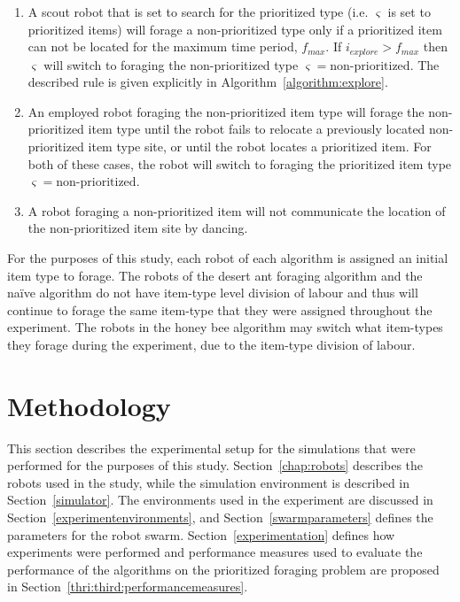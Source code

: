\documentclass[preprint,12pt]{elsarticle}
\begin{document}
\begin{enumerate}
\item A scout robot that is set to search for the prioritized type (i.e. $\varsigma$ is set to prioritized items) will forage a non-prioritized type only if a prioritized item can not be located for the maximum time period, $f_{max}$. If $i_{explore} > f_{max}$ then $\varsigma$ will switch to foraging the non-prioritized type $\varsigma=\text{non-prioritized}$. The described rule is given explicitly in Algorithm~\ref{algorithm:explore}.
\item An employed robot foraging the non-prioritized item type will forage the non-prioritized item type until the robot fails to relocate a previously located non-prioritized item type site, or until the robot locates a prioritized item. For both of these cases, the robot will switch to foraging the prioritized item type $\varsigma=\text{non-prioritized}$.
\item A robot foraging a non-prioritized item will not communicate the location of the non-prioritized item site by dancing. 
\end{enumerate}

For the purposes of this study, each robot of each algorithm is assigned an initial item type to forage. The robots of the desert ant foraging algorithm and the na\"ive algorithm do not have item-type level division of labour and thus will continue to forage the same item-type that they were assigned throughout the experiment. The robots in the honey bee algorithm may switch what item-types they forage during the experiment, due to the item-type division of labour. 

\section{Methodology}
\label{methodology}
This section describes the experimental setup for the simulations that were performed for the purposes of this study. Section~\ref{chap:robots} describes the robots used in the study, while the simulation environment is described in Section~\ref{simulator}. The environments used in the experiment are discussed in Section~\ref{experimentenvironments}, and Section~\ref{swarmparameters} defines the parameters for the robot swarm. Section~\ref{experimentation} defines how experiments were performed and performance measures used to evaluate the performance of the algorithms on the prioritized foraging problem are proposed in Section~\ref{thri:third:performancemeasures}.
\end{document}
